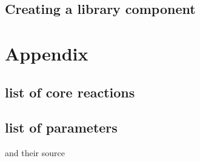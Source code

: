 \documentclass[english]{report}
\begin{document}
\section{Creating a library component}


\chapter{Appendix}


\section{list of core reactions}


\section{list of parameters}

and their source
\end{document}
